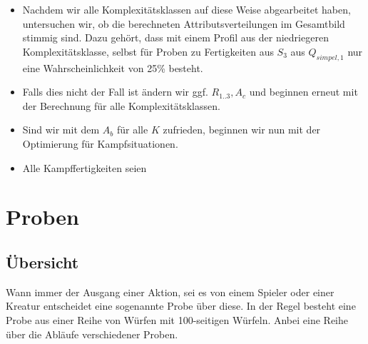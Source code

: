 \documentclass[a4paper,12pt,oneside]{book}
\begin{document}
\begin{itemize}
\item Nachdem wir alle Komplexitätsklassen auf diese Weise abgearbeitet haben, untersuchen wir, ob die berechneten Attributsverteilungen im Gesamtbild stimmig sind. Dazu gehört, dass mit einem Profil aus der niedriegeren Komplexitätsklasse, selbst für Proben zu Fertigkeiten aus $S_3$ aus $Q_{simpel,1}$ nur eine Wahrscheinlichkeit von 25\% besteht.
\item Falls dies nicht der Fall ist ändern wir ggf. $R_{1..3}, A_{c}$ und beginnen erneut mit der Berechnung für alle Komplexitätsklassen.
\item Sind wir mit dem $A_b$ für alle $K$ zufrieden, beginnen wir nun mit der Optimierung für Kampfsituationen.
\item Alle Kampffertigkeiten seien 
\end{itemize}

\chapter{Proben}
\section{Übersicht}
Wann immer der Ausgang einer Aktion, sei es von einem Spieler oder einer Kreatur entscheidet eine sogenannte Probe über diese. In der Regel besteht eine Probe aus einer Reihe von Würfen mit 100-seitigen Würfeln. Anbei eine Reihe über die Abläufe verschiedener Proben. 
\end{document}
